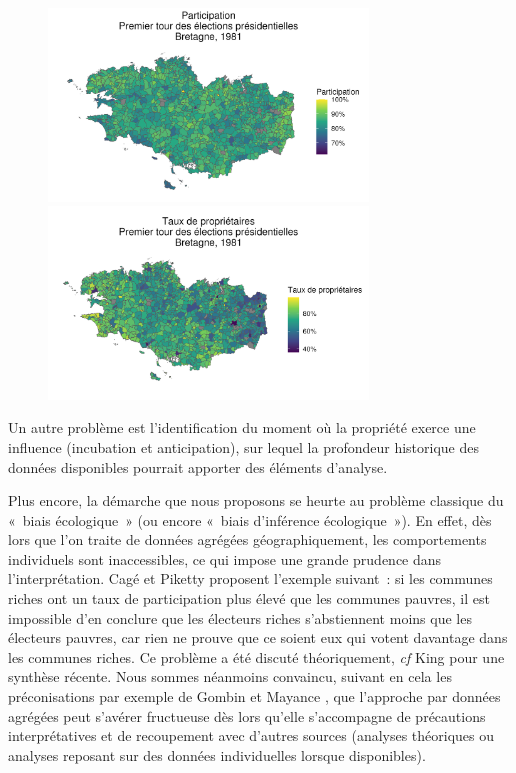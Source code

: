 \documentclass[a4paper,14pt]{article}
\begin{document}
\begin{figure}[H]
    \centering
    \begin{minipage}[t]{8.5cm}
         \includegraphics[width=8.5cm]{part_1981_Bre.png}
    \end{minipage}
    \begin{minipage}[t]{8.5cm}
        \includegraphics[width=8.5cm]{ppropri_1981_Bre.png}
    \end{minipage}
\end{figure}
\begin{multicols}{2}
 Un autre problème est l'identification du moment où la propriété exerce une influence (incubation et anticipation), sur lequel la profondeur historique des données disponibles pourrait apporter des éléments d'analyse. 
 
 Plus encore, la démarche que nous proposons se heurte au problème classique du «~biais écologique~» (ou encore «~biais d'inférence écologique~»). En effet, dès lors que l'on traite de données agrégées géographiquement, les comportements individuels sont inaccessibles, ce qui impose une grande prudence dans l'interprétation. Cagé et Piketty proposent l'exemple suivant~: si les communes riches ont un taux de participation plus élevé que les communes pauvres, il est impossible d'en conclure que les électeurs riches s'abstiennent moins que les électeurs pauvres, car rien ne prouve que ce soient eux qui votent davantage dans les communes riches. Ce problème a été discuté théoriquement, \textit{cf} King \parencite{king_solution_1997} pour une synthèse récente. Nous sommes néanmoins convaincu, suivant en cela les préconisations par exemple de Gombin et Mayance \parencite{gombin_analyse_2010}, que l'approche par données agrégées peut s'avérer fructueuse dès lors qu'elle s'accompagne de précautions interprétatives et de recoupement avec d'autres sources (analyses théoriques ou analyses reposant sur des données individuelles lorsque disponibles).



\end{multicols}
\printbibliography
\end{document}
